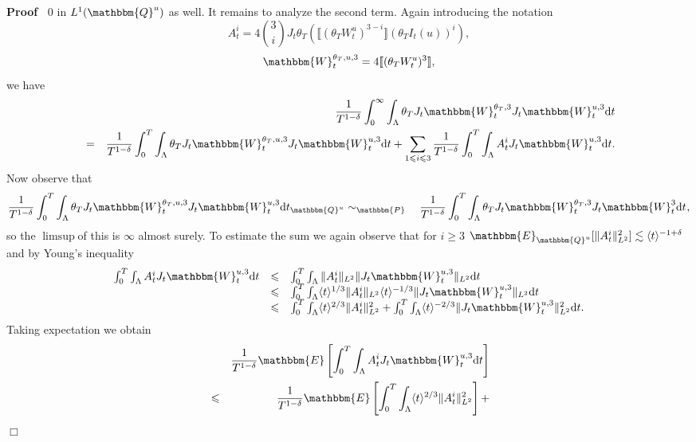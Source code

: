 \documentclass[11pt]{article}
\newcommand{\mathd}{\mathrm{d}}
\newenvironment{proof}{\noindent\textbf{Proof\ }}{\hspace*{\fill}$\Box$\medskip}
\begin{document}
\begin{proof}
  $0$ in $L^1 (\mathbbm{Q}^u)$ as well. It remains to analyze the second term.
  Again introducing the notation
  \[ A_t^i = 4 \binom{3}{i} J_t \theta_T (\llbracket (\theta_T W^u_t)^{3 - i}
     \rrbracket (\theta_T I_t (u))^i), \]
  \[ \mathbbm{W}_t^{\theta_T, u, 3} = 4 \llbracket (\theta_T W^u_t)^3
     \rrbracket, \]
  we have
  \begin{eqnarray*}
    &  & \frac{1}{T^{1 - \delta}} \int^{\infty}_0 \int_{\Lambda} \theta_T J_t
    \mathbbm{W}_t^{\theta_T, 3} J_t \mathbbm{W}_t^{u, 3} \mathd t\\
    & = & \frac{1}{T^{1 - \delta}} \int^T_0 \int_{\Lambda} \theta_T J_t
    \mathbbm{W}_t^{\theta_T, u, 3} J_t \mathbbm{W}_t^{u, 3} \mathd t + \sum_{1
    \leqslant i \leqslant 3} \frac{1}{T^{1 - \delta}} \int^T_0 \int_{\Lambda}
    A_t^i J_t \mathbbm{W}_t^{u, 3} \mathd t.
  \end{eqnarray*}
  Now observe that
  \[ \frac{1}{T^{1 - \delta}} \int^T_0 \int_{\Lambda} \theta_T J_t
     \mathbbm{W}_t^{\theta_T, u, 3} J_t \mathbbm{W}_t^{u, 3} \mathd t_{\mathbbm{Q}^u} \sim_{\mathbbm{P} \quad} \frac{1}{T^{1 - \delta}}
     \int^T_0 \int_{\Lambda} \theta_T J_t \mathbbm{W}_t^{\theta_T, 3} J_t
     \mathbbm{W}_t^3 \mathd t_{}, \]
  so the $\limsup$of this is $\infty$ almost surely. To estimate the sum we
  again observe that for $i \geqslant 3$ $\mathbbm{E}_{\mathbbm{Q}^u} [\|
  A_t^i \|^2_{L^2}] \lesssim \langle t \rangle^{- 1 + \delta}$ and by Young's
  inequality
  \[ \begin{array}{lll}
       \int^T_0 \int_{\Lambda} A_t^i J_t \mathbbm{W}_t^{u, 3} \mathd t &
       \leqslant & \int^T_0 \int_{\Lambda} \| A_t^i \|_{L^2} \| J_t
       \mathbbm{W}_t^{u, 3} \|_{L^2} \mathd t\\
       & \leqslant & \int^T_0 \int_{\Lambda} \langle t \rangle^{1 / 3} \|
       A_t^i \|_{L^2} \langle t \rangle^{- 1 / 3} \| J_t \mathbbm{W}_t^{u, 3}
       \|_{L^2} \mathd t\\
       & \leqslant & \int^T_0 \int_{\Lambda} \langle t \rangle^{2 / 3} \|
       A_t^i \|^2_{L^2} + \int^T_0 \int_{\Lambda} \langle t \rangle^{- 2 / 3}
       \| J_t \mathbbm{W}_t^{u, 3} \|^2_{L^2} \mathd t.
     \end{array} \]
  Taking expectation we obtain
  \begin{eqnarray*}
    &  & \frac{1}{T^{1 - \delta}} \mathbbm{E} \left[ \int^T_0 \int_{\Lambda}
    A_t^i J_t \mathbbm{W}_t^{u, 3} \mathd t \right]\\
    & \leqslant & \frac{1}{T^{1 - \delta}} \mathbbm{E} \left[ \int^T_0
    \int_{\Lambda} \langle t \rangle^{2 / 3} \| A_t^i \|^2_{L^2} \right] +

\end{eqnarray*}
\end{proof}
\end{document}
